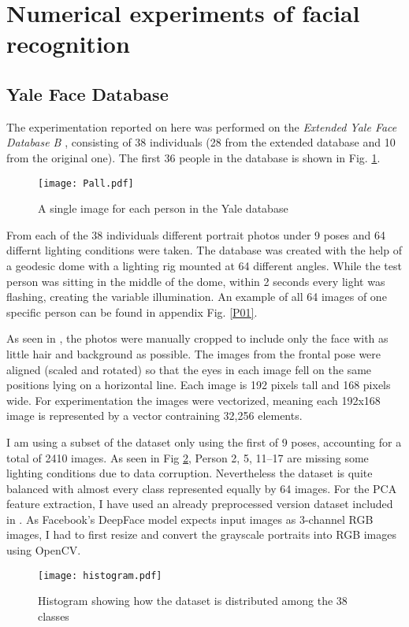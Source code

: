 \section{Numerical experiments of facial recognition}
\subsection{Yale Face Database}
The experimentation reported on here was performed on the \textit{Extended Yale
Face Database B} \cite{yalefaceB}, consisting of 38 individuals (28 from the
extended database and 10 from the original one)\footnotemark. The first 36
people in the database is shown in Fig. \ref{Pall}.


\begin{figure}[h]
  \centering
  \texttt{[image: Pall.pdf]} 
  \caption{A single image for each person in the Yale database}
  \label{Pall}
\end{figure}

From each of the 38 individuals different portrait photos under 9 poses and 64
differnt lighting conditions were taken. The database was created with the help
of a geodesic dome with a lighting rig mounted at 64 different angles. While the
test person was sitting in the middle of the dome, within 2 seconds every light
was flashing, creating the variable illumination. An example of all 64 images of
one specific person can be found in appendix Fig. \ref{P01}.

As seen in \cite{yalefaceBcropped}, the photos were manually cropped
to include only the face with as little hair and background as possible. The
images from the frontal pose were aligned (scaled and rotated) so that the eyes
in each image fell on the same positions lying on a horizontal line. Each image
is 192 pixels tall and 168 pixels wide. For experimentation the images were
vectorized, meaning each 192x168 image is represented by a vector contraining
32,256 elements. 

I am using a subset of the dataset only using the first of 9 poses, accounting
for a total of 2410 images. As seen in Fig \ref{histogram}, Person 2, 5, 11--17
are missing some lighting conditions due to data corruption. Nevertheless the
dataset is quite balanced with almost every class represented equally by 64
images. For the PCA feature extraction, I have used an already preprocessed
version dataset included in \cite{brunton2019data}. As Facebook's DeepFace model
expects input images as 3-channel RGB images, I had to first resize and convert
the grayscale portraits into RGB images using OpenCV\cite{opencv_library}.

\begin{figure}[h]
  \centering
  \texttt{[image: histogram.pdf]}
  \caption{Histogram showing how the dataset is distributed among the 38 classes}
  \label{histogram}
\end{figure}

